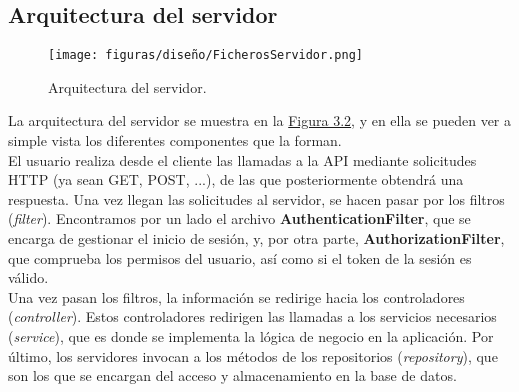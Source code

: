 \subsection{Arquitectura  del servidor}

\begin{figure}[H]
\centerline{\texttt{[image: figuras/diseño/FicherosServidor.png]}}
\caption{Arquitectura del servidor.}
\label{enlaceArquitecturaServidor}
\end{figure}

La arquitectura del servidor se muestra en la \hyperref[enlaceArquitecturaServidor]{Figura 3.2}, y en ella se pueden ver a simple vista los diferentes componentes que la forman.
\\

El usuario realiza desde el cliente las llamadas a la API mediante solicitudes HTTP (ya sean GET, POST, ...), de las que posteriormente obtendrá una respuesta. Una vez llegan las solicitudes al servidor, se hacen pasar por los filtros ({\it filter}). Encontramos por un lado el archivo {\bf AuthenticationFilter}, que se encarga de gestionar el inicio de sesión, y, por otra parte, {\bf AuthorizationFilter}, que comprueba los permisos del usuario, así como si el token de la sesión es válido.
\\

Una vez pasan los filtros, la información se redirige hacia los controladores ({\it controller}). Estos controladores redirigen las llamadas a los servicios necesarios ({\it service}), que es donde se implementa la lógica de negocio en la aplicación. Por último, los servidores invocan a los métodos de los repositorios ({\it repository}), que son los que se encargan del acceso y almacenamiento en la base de datos.
\\

